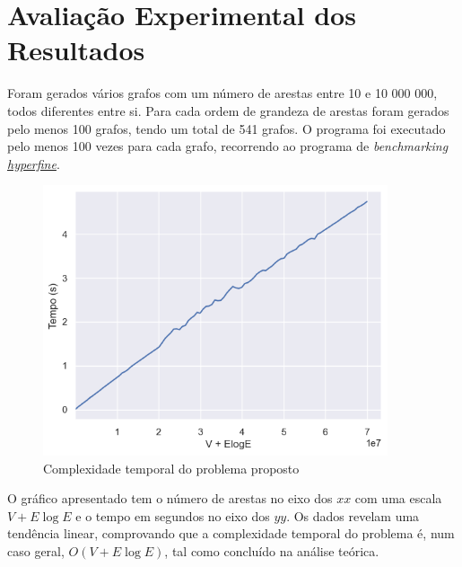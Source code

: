 \documentclass[12pt,a4paper]{article}
\begin{document}
  \section{Avaliação Experimental dos Resultados}

  Foram gerados vários grafos com um número de arestas entre 10 e 10 000 000, todos diferentes entre si. Para cada ordem de grandeza de arestas foram gerados pelo menos 100 grafos, tendo um total de 541 grafos.
  O programa foi executado pelo menos 100 vezes para cada grafo, recorrendo ao programa de \textit{benchmarking} \href{https://github.com/sharkdp/hyperfine}{\textit{hyperfine}}.

  \begin{figure}[h]
    \centering
    \includegraphics[width=4in]{report.png}
    \caption{Complexidade temporal do problema proposto}
  \end{figure}

  O gráfico apresentado tem o número de arestas no eixo dos $xx$ com uma escala $V + E \log E$ e o tempo em segundos no eixo dos $yy$.
  Os dados revelam uma tendência linear, comprovando que a complexidade temporal do problema é, num caso geral, $O(V + E\log E)$, tal como concluído na análise teórica.

  \printbibliography[title={Referência}]
\end{document}
